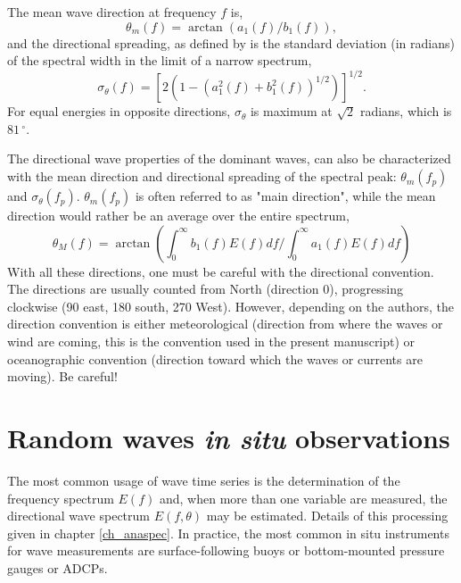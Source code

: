The mean wave direction at frequency $f$ is, 
\begin{equation}
\theta_{m}(f)=\arctan(a_{1}(f)/b_{1}(f)),
\label{eq3.20}
\end{equation}
and the directional spreading, as defined by \cite{Kuik&al.1988} is the standard deviation (in radians) of the spectral width
in the limit of a narrow spectrum,
\begin{equation}
\sigma_{\theta}(f)=\left[2(1-(a_{1}^{2}(f)+b_{1}^{2}(f))^{1/2}) \right]^{1/2}.
\label{eq3.21}
\end{equation}
For equal energies in opposite directions, $\sigma_{\theta}$ is maximum at 
$\sqrt{2}$ radians, which is $81\,^{\circ}$. 

The directional wave properties of the dominant waves, can also be characterized with the 
mean direction and directional spreading of the spectral peak: $\theta_{m}(f_{p})$ and $\sigma_{\theta}(f_{p})$. 
$\theta_{m}(f_{p})$ is often referred to as "main direction", while the mean direction would rather be an average
over the entire spectrum,
\begin{equation}
\theta_{M}(f)=\arctan \left(\int_{0}^{\infty} b_{1}(f) E(f)df/\int_{0}^{\infty} a_{1}(f) E(f)df\right)
\label{eq3.22}
\end{equation}
With all these directions, one must be careful with the directional convention. The directions are usually counted
from North (direction 0), progressing clockwise (90 east, 180 south, 270 West). However, depending on the authors, the direction convention is either meteorological (direction
from where the waves or wind are coming, this is the convention used in the present manuscript) or oceanographic convention
(direction toward which the waves or currents are moving). Be careful!

 

 \section{Random waves \textit{in situ} observations}
 The most common usage of wave time series is the determination of the frequency spectrum $E(f)$ and, when more than 
 one variable are measured, the directional wave spectrum $E(f,\theta)$ may be estimated. Details of this processing 
 given in chapter \ref{ch_anaspec}. In practice, the most common in situ 
 instruments for wave measurements are surface-following buoys or bottom-mounted pressure gauges or ADCPs.  
 
